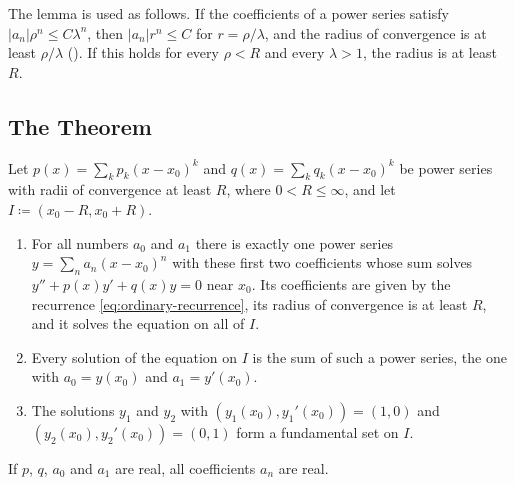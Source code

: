 The lemma is used as follows. If the coefficients of a power series satisfy $|a_n|\rho^n\le C\lambda^n$, then $|a_n|r^n\le C$ for $r=\rho/\lambda$, and the radius of convergence is at least $\rho/\lambda$ (). If this holds for every $\rho<R$ and every $\lambda>1$, the radius is at least $R$.

\subsection{The Theorem}

\begin{theorem}
\label{thm:ordinary-point}
Let $p(x)=\sum_kp_k(x-x_0)^k$ and $q(x)=\sum_kq_k(x-x_0)^k$ be power series with radii of convergence at least $R$, where $0<R\le\infty$, and let $I\coloneqq(x_0-R,x_0+R)$.
\begin{enumerate}
\item For all numbers $a_0$ and $a_1$ there is exactly one power series $y=\sum_na_n(x-x_0)^n$ with these first two coefficients whose sum solves $y''+p(x)y'+q(x)y=0$ near $x_0$. Its coefficients are given by the recurrence \eqref{eq:ordinary-recurrence}, its radius of convergence is at least $R$, and it solves the equation on all of $I$.
\item Every solution of the equation on $I$ is the sum of such a power series, the one with $a_0=y(x_0)$ and $a_1=y'(x_0)$.
\item The solutions $y_1$ and $y_2$ with $(y_1(x_0),y_1'(x_0))=(1,0)$ and $(y_2(x_0),y_2'(x_0))=(0,1)$ form a fundamental set on $I$.
\end{enumerate}
If $p$, $q$, $a_0$ and $a_1$ are real, all coefficients $a_n$ are real.
\end{theorem}

